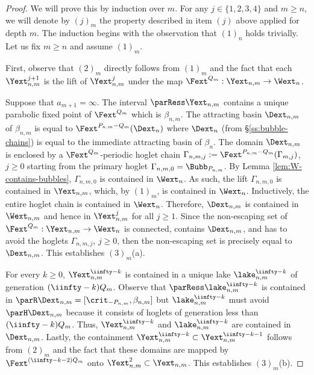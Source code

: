 \documentclass{amsart}
\begin{document}
\begin{proof}
    We will prove this by induction over $m$. 
    For any $j \in \{1,2,3,4\}$ and $m \geq n$, we will denote by $(j)_m$ the property described in item $(j)$ above applied for depth $m$. 
    The induction begins with the observation that $(1)_n$ holds trivially. 
    Let us fix $m \geq n$ and assume $(1)_m$.
    
    First, observe that $(2)_m$ directly follows from $(1)_m$ and the fact that each $\Yext^{j+1}_{n,m}$ is the lift of $\Yext^j_{n,m}$ under the map $\Fext^{Q_m}:\Yext_{n,m} \to \Wext_n$.
    
    Suppose that $a_{m+1}=\infty$. 
    The interval $\parRess \Yext_{n,m}$ contains a unique parabolic fixed point of $\Fext^{Q_m}$ which is $\beta_{n,m}$. 
    The attracting basin $\Dext_{n,m}$ of $\beta_{n,m}$ is equal to $\Fext^{P_{n,m}-Q_m}(\Dext_n)$ where $\Dext_n$ (from \S\ref{ss:bubble-chains}) is equal to the immediate attracting basin of $\beta_n$.
    The domain $\Dext_{n,m}$ is enclosed by a $\Fext^{Q_m}$-periodic hoglet chain $\Gamma_{n,m,j} := \Fext^{P_{n,m}-Q_m}(\Gamma_{m,j})$, $j \geq 0$ starting from the primary hoglet $\Gamma_{n,m,0} = \Bubb_{P_{n,m}}$.
    By Lemma \ref{lem:W-contains-bubbles}, $\Gamma_{n,m,0}$ is contained in $\Wext_n$.
    As such, the lift $\Gamma_{n,m,0}$ is contained in $\Yext_{n,m}$, which, by $(1)_m$, is contained in $\Wext_n$. 
    Inductively, the entire hoglet chain is contained in $\Wext_n$. 
    Therefore, $\Dext_{n,m}$ is contained in $\Wext_{n,m}$ and hence in $\Yext^j_{n,m}$ for all $j \geq 1$. 
    Since the non-escaping set of $\Fext^{Q_m}: \Yext_{n,m} \to \Wext_n$ is connected, contains $\Dext_{n,m}$, and has to avoid the hoglets $\Gamma_{n,m,j}$, $j \geq 0$, then the non-escaping set is precisely equal to $\Dext_{n,m}$. 
    This establishes $(3)_m$(a).
    
    For every $k \geq 0$, $\Yext^{\iinfty-k}_{n,m}$ is contained in a unique lake $\lake^{\iinfty-k}_{n,m}$ of generation $(\iinfty-k)Q_m$. 
    Observe that $\parRess \lake^{\iinfty-k}_{n,m}$ is contained in $\parR \Dext_{n,m} = [\crit_{-P_{n,m}}, \beta_{n,m}]$ but $\lake^{\iinfty-k}_{n,m}$ must avoid $\parH \Dext_{n,m}$ because it consists of hoglets of generation less than $(\iinfty-k)Q_m$. 
    Thus, $\Yext^{\iinfty-k}_{n,m}$ and $\lake^{\iinfty-k}_{n,m}$ are contained in $\Dext_{n,m}$. 
    Lastly, the containment $\Yext^{\iinfty-k}_{n,m} \subset \Yext^{\iinfty-k-1}_{n,m}$ follows from $(2)_m$ and the fact that these domains are mapped by $\Fext^{(\iinfty-k-2)Q_m}$ onto $\Yext^2_{n,m} \subset \Yext_{n,m}$. This establishes $(3)_m$(b).


\end{proof}
\end{document}
